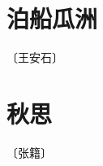 \documentclass[12pt,UTF-8,openany]{ctexbook}
\begin{document}
\vspace{8pt}


\section{泊船瓜洲}

\begin{center}
    \vspace{10pt}
    
    \begin{normalsize}
        
        〔王安石〕
        
    \end{normalsize}
    
    \vspace{8pt}
    
    \begin{large}
        
        
        
    \end{large}
    
\end{center}

\vspace{8pt}


\section{秋思}

\begin{center}
    \vspace{10pt}
    
    \begin{normalsize}
        
        〔张籍〕
        
    \end{normalsize}
    
    \vspace{8pt}
    
    \begin{large}
        
        
        
    \end{large}
    
\end{center}
\end{document}
